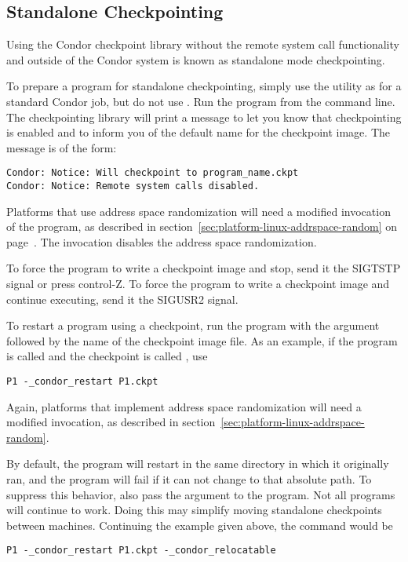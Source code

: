 \subsection{\label{sec:standalone-ckpt}Standalone Checkpointing}

Using the Condor checkpoint library without the remote system call
functionality and outside of the Condor system is known as standalone
mode checkpointing.

To prepare a program for standalone checkpointing, simply use the
 utility as for a standard Condor job, 
but do not use .
Run the program from the command line.
The checkpointing library will print a message to let you know
that checkpointing is enabled and to inform you of the default
name for the checkpoint image.
The message is of the form:

\footnotesize
\begin{verbatim}
Condor: Notice: Will checkpoint to program_name.ckpt
Condor: Notice: Remote system calls disabled.
\end{verbatim}
\normalsize

Platforms that use address space randomization will need
a modified invocation of the program,
as described in section~\ref{sec:platform-linux-addrspace-random} on
page~\pageref{sec:platform-linux-addrspace-random}.
The invocation disables the address space randomization.
 
To force the program to write a checkpoint image and stop, send it
the SIGTSTP signal or press control-Z.  To force the program to 
write a checkpoint image and continue executing, send it the
SIGUSR2 signal.

To restart a program using a checkpoint, run the program
with the argument
 followed by the name of the checkpoint
image file.
As an example, if the program is called  and
the checkpoint is called , use
\begin{verbatim}
P1 -_condor_restart P1.ckpt
\end{verbatim}
Again, platforms that implement address space randomization will
need a modified invocation,
as described in section~\ref{sec:platform-linux-addrspace-random}.

By default, the program will restart in the same directory 
in which it originally ran, 
and the program will fail if it can not change to that absolute path.
To suppress this behavior, 
also pass the  argument 
to the program. 
Not all programs will continue to work.  
Doing this may simplify moving standalone checkpoints between machines.
Continuing the example given above,
the command would be
\begin{verbatim}
P1 -_condor_restart P1.ckpt -_condor_relocatable
\end{verbatim}

